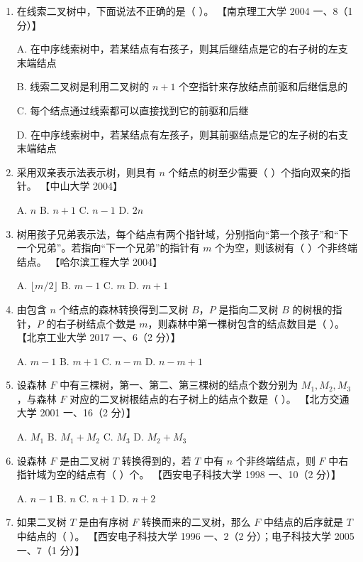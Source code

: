 \documentclass[lang=cn,newtx,10pt,scheme=chinese]{elegantbook}
\begin{document}
\begin{enumerate}
    \item 在线索二叉树中，下面说法不正确的是（ ）。  
    【南京理工大学 2004 一、8（1 分）】  

    A. 在中序线索树中，若某结点有右孩子，则其后继结点是它的右子树的左支末端结点  

    B. 线索二叉树是利用二叉树的 $n + 1$ 个空指针来存放结点前驱和后继信息的  

    C. 每个结点通过线索都可以直接找到它的前驱和后继 

    D. 在中序线索树中，若某结点有左孩子，则其前驱结点是它的左子树的右支末端结点  

    \item 采用双亲表示法表示树，则具有 $n$ 个结点的树至少需要（ ）个指向双亲的指针。  
    【中山大学 2004】  

    A. $n$ \quad B. $n + 1$ \quad C. $n - 1$ \quad D. $2n$  

    \item 树用孩子兄弟表示法，每个结点有两个指针域，分别指向“第一个孩子”和“下一个兄弟”。若指向“下一个兄弟”的指针有 $m$ 个为空，则该树有（ ）个非终端结点。  
    【哈尔滨工程大学 2004】  

    A. $\lfloor m / 2 \rfloor$ \quad B. $m - 1$ \quad C. $m$ \quad D. $m + 1$  

    \item 由包含 $n$ 个结点的森林转换得到二叉树 $B$，$P$ 是指向二叉树 $B$ 的树根的指针，$P$ 的右子树结点个数是 $m$，则森林中第一棵树包含的结点数目是（ ）。  
    【北京工业大学 2017 一、6（2 分）】  

    A. $m - 1$ \quad B. $m + 1$ \quad C. $n - m$ \quad D. $n - m + 1$  

    \item 设森林 $F$ 中有三棵树，第一、第二、第三棵树的结点个数分别为 $M_1, M_2, M_3$，与森林 $F$ 对应的二叉树根结点的右子树上的结点个数是（ ）。  
    【北方交通大学 2001 一、16（2 分）】  

    A. $M_1$ \quad B. $M_1 + M_2$ \quad C. $M_3$ \quad D. $M_2 + M_3$  

    \item 设森林 $F$ 是由二叉树 $T$ 转换得到的，若 $T$ 中有 $n$ 个非终端结点，则 $F$ 中右指针域为空的结点有（ ）个。  
    【西安电子科技大学 1998 一、10（2 分）】  

    A. $n - 1$ \quad B. $n$ \quad C. $n + 1$ \quad D. $n + 2$  

    \item 如果二叉树 $T$ 是由有序树 $F$ 转换而来的二叉树，那么 $F$ 中结点的后序就是 $T$ 中结点的（ ）。  
    【西安电子科技大学 1996 一、2（2 分）；电子科技大学 2005 一、7（1 分）】  


\end{enumerate}
\end{document}

